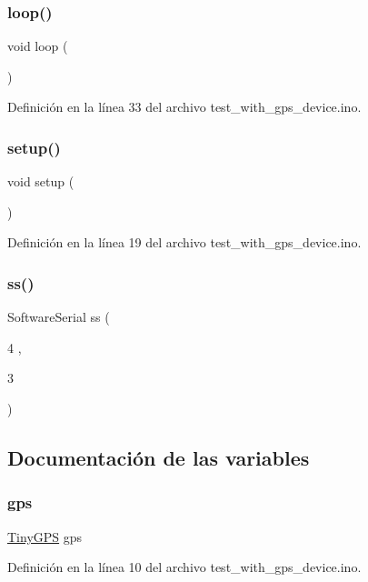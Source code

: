 \subsubsection{\texorpdfstring{loop()}{loop()}}
{\footnotesize\ttfamily void loop (\begin{DoxyParamCaption}{ }\end{DoxyParamCaption})}



Definición en la línea 33 del archivo test\+\_\+with\+\_\+gps\+\_\+device.\+ino.

\mbox{\label{test__with__gps__device_8ino_a4fc01d736fe50cf5b977f755b675f11d}} 
\subsubsection{\texorpdfstring{setup()}{setup()}}
{\footnotesize\ttfamily void setup (\begin{DoxyParamCaption}{ }\end{DoxyParamCaption})}



Definición en la línea 19 del archivo test\+\_\+with\+\_\+gps\+\_\+device.\+ino.

\mbox{\label{test__with__gps__device_8ino_ad6146be3f2c4ff5ac64c90ef5d1b37b1}} 
\subsubsection{\texorpdfstring{ss()}{ss()}}
{\footnotesize\ttfamily Software\+Serial ss (\begin{DoxyParamCaption}\item[{4}]{,  }\item[{3}]{ }\end{DoxyParamCaption})}



\subsection{Documentación de las variables}
\mbox{\label{test__with__gps__device_8ino_a4e2f9a5d1b23f30f530101af71f72744}} 
\subsubsection{\texorpdfstring{gps}{gps}}
{\footnotesize\ttfamily \hyperlink{class_tiny_g_p_s}{Tiny\+G\+PS} gps}



Definición en la línea 10 del archivo test\+\_\+with\+\_\+gps\+\_\+device.\+ino.

